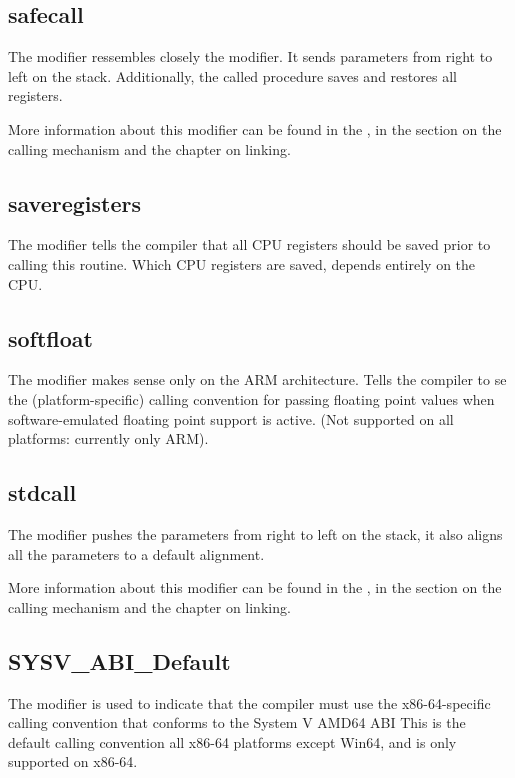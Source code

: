 \subsection{safecall}
The  modifier ressembles closely the  modifier.
It sends parameters from right to left on the stack. Additionally, the
called procedure saves and restores all registers.

More information about this modifier can be found in the \progref, in the
section on the calling mechanism and the chapter on linking.

\subsection{saveregisters}
The  modifier tells the compiler that all CPU registers should be
saved prior to calling this routine. Which CPU registers are saved, depends
entirely on the CPU.

\subsection{softfloat}
The   modifier makes sense only on the ARM architecture.
Tells the compiler to se the (platform-specific) calling convention for passing floating
point values when software-emulated floating point support is active.
(Not supported on all platforms: currently only ARM).


\subsection{stdcall}
The  modifier pushes the parameters from right to left on the stack,
it also aligns all the parameters to a default alignment.

More information about this modifier can be found in the \progref, in the
section on the calling mechanism and the chapter on linking.

\subsection{SYSV\_ABI\_Default}
The  modifier is used to indicate that the compiler must
use the x86-64-specific calling convention that conforms to the System V AMD64
ABI
This is the default calling convention all x86-64 platforms except Win64,
and is only supported on x86-64.


